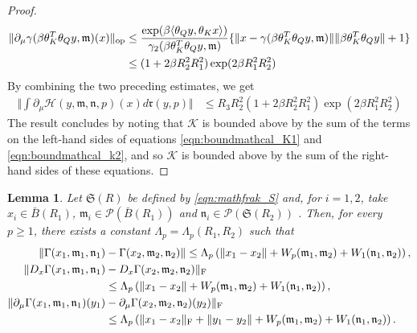 \documentclass{article}
\newtheorem{lemma}[theorem]{Lemma}
\begin{document}
\begin{appendices}
\begin{proof}
\begin{align}
 \Vert \partial_\mu\gamma(\beta \theta_K^T\theta_Q y,\mathfrak{m})(x)\Vert_\mathrm{op}&\le  \frac{\exp(\beta \langle \theta_Qy,\theta_Kx\rangle)}{\gamma_2(\beta  \theta_K^T\theta_Qy,\mathfrak{m})}\{\Vert x-\gamma(\beta \theta_K^T\theta_Qy,\mathfrak{m})\Vert \Vert \beta\theta_K^T\theta_Qy\Vert+1\}  \\
 &\le (1+2\beta R_2^2R_1^2)\exp(2\beta R_1^2R_2^2)\notag
\end{align}
By combining the two preceding estimates, we get
\begin{align}
     \bigg\Vert \int \partial_\mu \mathcal H(y,\mathfrak{m}, \mathfrak{n},p)(x)d\mathfrak{r}(y,p)\bigg\Vert
    & \le  R_3 R_2^2(1+2\beta R_2^2R_1^2)\exp(2\beta R_1^2R_2^2)\label{eqn:boundmathcal_k2}
\end{align}
The result concludes by noting that $\mathcal K$ is bounded above by the sum of the terms on the left-hand sides of equations \eqref{eqn:boundmathcal_K1} and \eqref{eqn:boundmathcal_k2}, and so $\mathcal K$ is bounded above by the sum of the right-hand sides of these equations.
\end{proof}
\begin{lemma}\label{lemma:Lipderivs}
Let $\mathfrak{S}(R)$ be defined by \ref{eqn:mathfrak_S} and, for $i=1,2$, take $x_i\in \bar B(R_1)$, $\mathfrak{m}_i \in \mathcal P(\bar B(R_1))$ and $\mathfrak{n}_i\in \mathcal P(\mathfrak{S}(R_2))$ . Then, for every $p\ge 1$, there exists a constant $\Lambda_p= \Lambda_p(R_1,R_2)$ such that
    \begin{align}
        \Vert\Gamma(x_1,\mathfrak{m}_1,\mathfrak{n}_1)&-\Gamma(x_2,\mathfrak{m}_2,\mathfrak{n}_2)\Vert \le \Lambda_{p} \left(\Vert x_1-x_2\Vert + W_p(\mathfrak{m}_1,\mathfrak{m}_2)+ W_1(\mathfrak{n}_1,\mathfrak{n}_2) \right),\label{eqn:LipGamma}\\
        \Vert D_x\Gamma(x_1,\mathfrak{m}_1,\mathfrak{n}_1)&-D_x\Gamma (x_2,\mathfrak{m}_2,\mathfrak{n}_2)\Vert_\mathrm{F}  \label{eqn:LipDxGamma}\\&\le \Lambda_{p} \left(\Vert x_1-x_2\Vert + W_p(\mathfrak{m}_1,\mathfrak{m}_2)+ W_1(\mathfrak{n}_1,\mathfrak{n}_2) \right),\notag\\
        \Vert \partial_\mu\Gamma(x_1,\mathfrak{m}_1,\mathfrak{n}_1)(y_1)&-\partial_\mu\Gamma (x_2,\mathfrak{m}_2,\mathfrak{n}_2)(y_2)\Vert_\mathrm{F}\label{eqn:LipDmuGamma}\\&\le\Lambda_{p} \left(\Vert x_1-x_2\Vert_\mathrm{F} + \Vert y_1-y_2\Vert+ W_p(\mathfrak{m}_1,\mathfrak{m}_2)+ W_1(\mathfrak{n}_1,\mathfrak{n}_2) \right).\notag
    \end{align}

\end{lemma}
\end{appendices}
\end{document}
